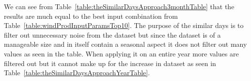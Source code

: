 We can see from Table~\ref{table:theSimilarDaysApproach3monthTable} that the results are much equal to the best input combination from Table~\ref{table:windProdInputParamsTop10}. The purpose of the similar days is to filter out unnecessary noise from the dataset but since the dataset is of a manageable size and in itself contain a seasonal aspect it does not filter out many values as seen in the table. When applying it on an entire year more values are filtered out but it cannot make up for the increase in dataset as seen in Table~\ref{table:theSimilarDaysApproachYearTable}.




